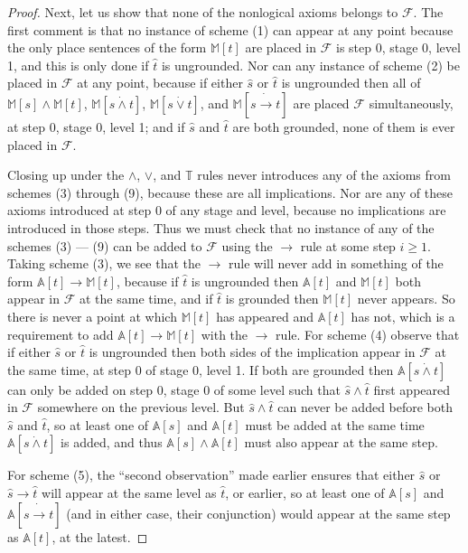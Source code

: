 \documentclass{amsart}
\theoremstyle{definition}
\begin{document}
\begin{proof}
  Next, let us show that none of the nonlogical axioms belongs to $\mathcal{F}$. The first comment is that
  no instance of scheme (1) can appear at any point because the only place sentences of the form
  $\mathbb{M}[t]$ are placed in $\mathcal{F}$ is step 0, stage 0, level 1, and this is only done if
  $\hat{t}$ is ungrounded.
  Nor can any instance of scheme (2) be placed in $\mathcal{F}$ at any point, because if either $\hat{s}$ or
  $\hat{t}$ is ungrounded then all of $\mathbb{M}[s] \wedge \mathbb{M}[t]$, $\mathbb{M}[s \dot{\wedge} t]$,
  $\mathbb{M}[s \dot{\vee} t]$, and $\mathbb{M}[s \dot{\to} t]$ are placed $\mathcal{F}$ simultaneously, at
  step 0, stage 0, level 1; and if $\hat{s}$ and $\hat{t}$ are both grounded, none of them is ever placed in
  $\mathcal{F}$.

  Closing up under the $\wedge$, $\vee$, and $\mathbb{T}$ rules never introduces any of the axioms from schemes
  (3) through (9), because these are all implications. Nor are any of these axioms introduced at step 0 of any
  stage and level, because no implications are introduced in those steps. Thus
  we must check that no instance of any of the schemes (3) --- (9) can be added to $\mathcal{F}$ using
  the $\to$ rule at some step $i \geq 1$. Taking scheme (3), we see that the $\to$ rule will never add in
  something of the form $\mathbb{A}[t] \to \mathbb{M}[t]$, because if $\hat{t}$ is ungrounded then
  $\mathbb{A}[t]$ and $\mathbb{M}[t]$ both appear in $\mathcal{F}$ at the same time,
  and if $\hat{t}$ is grounded then $\mathbb{M}[t]$ never appears. So there is never a point
  at which $\mathbb{M}[t]$ has appeared and $\mathbb{A}[t]$ has not, which is a requirement to
  add $\mathbb{A}[t] \to \mathbb{M}[t]$ with the $\to$ rule.
  For scheme (4) observe that if either $\hat{s}$ or $\hat{t}$ is ungrounded then both sides of the implication
  appear in $\mathcal{F}$ at the same time, at step 0 of stage 0, level 1. If both are grounded then
  $\mathbb{A}[s \dot{\wedge} t]$ can only be added on step 0, stage 0 of some level such that $\hat{s}\wedge\hat{t}$
  first appeared in $\mathcal{F}$ somewhere on the previous level. But
  $\hat{s}\wedge\hat{t}$ can never be added before both $\hat{s}$ and $\hat{t}$, so at least one of
  $\mathbb{A}[s]$ and $\mathbb{A}[t]$ must be added at the same time $\mathbb{A}[s\dot{\wedge} t]$ is added,
  and thus $\mathbb{A}[s] \wedge \mathbb{A}[t]$ must also appear at the same step.

  For scheme (5), the ``second observation'' made earlier ensures that either $\hat{s}$ or $\hat{s} \to \hat{t}$
  will appear at the same level as $\hat{t}$, or earlier, so at least one of $\mathbb{A}[s]$ and
  $\mathbb{A}[s\dot{\to} t]$ (and in either case, their conjunction)
  would appear at the same step as $\mathbb{A}[t]$, at the latest.


\end{proof}
\end{document}
